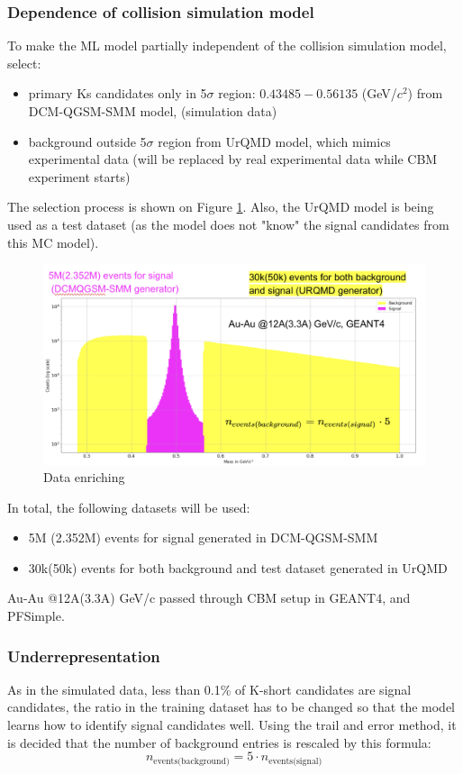 \subsubsection{Dependence of collision simulation model}
To make the ML model partially independent of the collision simulation model,  select:
\begin{itemize}
    \item primary Ks candidates only in 5$\sigma$ region: $0.43485 - 0.56135$ (GeV/$c^2$) from DCM-QGSM-SMM model, (simulation data)
    \item background outside 5$\sigma$ region from UrQMD model, which mimics experimental data (will be replaced by real experimental data while CBM experiment starts)
\end{itemize}
 The selection process is shown on Figure \ref{enriching}. Also, the UrQMD model is being used as a test dataset (as the model does not "know" the signal candidates from this MC model).
\begin{figure}[H]
    \centering
    \includegraphics[width=.8\textwidth]{img/dataset.png}
    \caption{Data enriching}
    \label{enriching}
\end{figure}
In total, the following datasets will be used:
\begin{itemize}
    \item 5M (2.352M) events for signal generated in DCM-QGSM-SMM
    \item 30k(50k) events for both background and test dataset generated in UrQMD
\end{itemize}
Au-Au @12A(3.3A) GeV/c passed through CBM setup in GEANT4, and PFSimple.


\subsubsection{Underrepresentation}
As in the simulated data, less than 0.1\% of K-short candidates are signal candidates, the ratio in the training dataset has to be changed so that the model learns how to identify signal candidates well. Using the trail and error method, it is decided that the number of background entries is rescaled by this formula:
\begin{equation}
    n_\text{events(background)} = 5 \cdot n_\text{events(signal)}
\end{equation}


